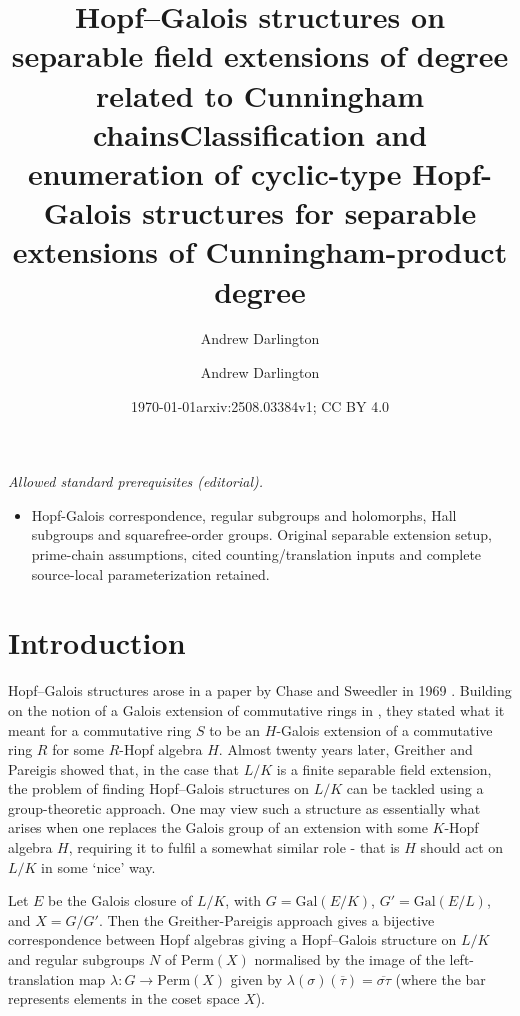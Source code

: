 \documentclass[a4paper,reqno]{amsart}
\title[Cunningham Chains]{Hopf--Galois structures on separable field extensions of degree related to Cunningham chains}
\author{Andrew Darlington}
\date{\today}
\title{Classification and enumeration of cyclic-type Hopf-Galois structures for separable extensions of Cunningham-product degree}
\author{Andrew Darlington}
\date{arxiv:2508.03384v1; CC BY 4.0}
\theoremstyle{definition}
\newcommand{\Gal}{\mathrm{Gal}}
\begin{document}
\maketitle
\noindent\textit{Allowed standard prerequisites (editorial).}\begin{itemize}
\item Hopf-Galois correspondence, regular subgroups and holomorphs, Hall subgroups and squarefree-order groups. Original separable extension setup, prime-chain assumptions, cited counting/translation inputs and complete source-local parameterization retained.
\end{itemize}\medskip
\section{Introduction}
Hopf--Galois structures arose in a paper by Chase and Sweedler in 1969 \cite{CS69}. Building on the notion of a Galois extension of commutative rings in \cite{CHR65}, they stated what it meant for a commutative ring $S$ to be an $H$-Galois extension of a commutative ring $R$ for some $R$-Hopf algebra $H$. Almost twenty years later, Greither and Pareigis \cite{GP87} showed that, in the case that $L/K$ is a finite separable field extension, the problem of finding Hopf--Galois structures on $L/K$ can be tackled using a group-theoretic approach. One may view such a structure as essentially what arises when one replaces the Galois group of an extension with some $K$-Hopf algebra $H$, requiring it to fulfil a somewhat similar role - that is $H$ should act on $L/K$ in some `nice' way. 

Let $E$ be the Galois closure of $L/K$, with $G=\Gal(E/K)$, $G'=\Gal(E/L)$, and $X=G/G'$. Then the Greither-Pareigis approach gives a bijective correspondence between Hopf algebras giving a Hopf--Galois structure on $L/K$ and regular subgroups $N$ of $\text{Perm}(X)$ normalised by the image of the left-translation map $\lambda: G \rightarrow \text{Perm}(X)$ given by $\lambda(\sigma)(\overline{\tau})=\overline{\sigma\tau}$ (where the bar represents elements in the coset space $X$). 
\end{document}
